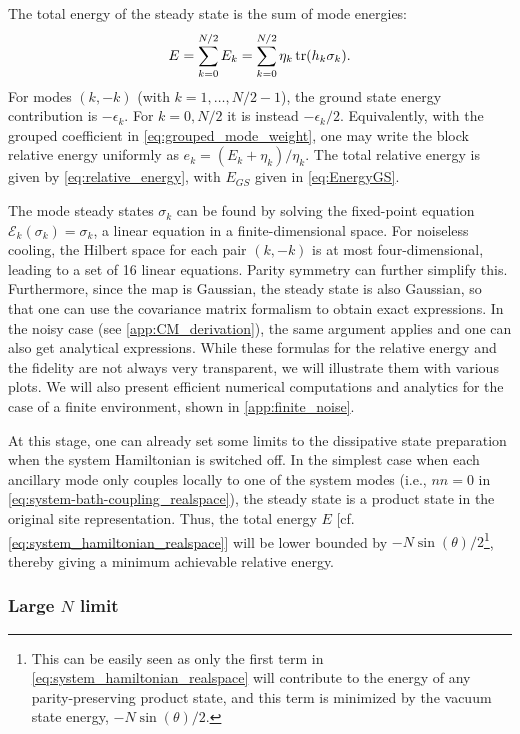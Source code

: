 \documentclass[aps,prx,twocolumn,superscriptaddress,nofootinbib,nolongbibliography,nobalancelastpage,10pt,floatfix]{revtex4-2}
\begin{document}
The total energy of the steady state is the sum of mode energies:
\begin{equation}
    E =\sum_{k=0}^{N/2} E_k = \sum_{k=0}^{N/2} \eta_k \operatorname{tr}( h_k \sigma_k).
\end{equation}
For modes $(k,-k)$ (with $k=1,\ldots,N/2-1$), the ground state energy contribution is $-\epsilon_k$.  For $k=0,N/2$ it is instead $-\epsilon_k/2$.  Equivalently, with the grouped coefficient in \cref{eq:grouped_mode_weight}, one may write the block relative energy uniformly as $e_k=(E_k+\eta_k)/\eta_k$. The total relative energy is given by \cref{eq:relative_energy}, with $E_{GS}$ given in \cref{eq:EnergyGS}.

The mode steady states $\sigma_k$ can be found by solving the fixed-point equation $\mathcal{E}_k(\sigma_k)=\sigma_k$, a linear equation in a finite-dimensional space. For noiseless cooling, the Hilbert space for each pair $(k,-k)$ is at most four-dimensional, leading to a set of 16 linear equations. Parity symmetry can further simplify this. Furthermore, since the map is Gaussian, the steady state is also Gaussian, so that one can use the covariance matrix formalism to obtain exact expressions. In the noisy case (see \cref{app:CM_derivation}), the same argument applies and one can also get analytical expressions. While these formulas for the relative energy and the fidelity are not always very transparent, we will illustrate them with various plots. We will also present efficient numerical computations and analytics for the case of a finite environment, shown in \cref{app:finite_noise}.

At this stage, one can already set some limits to the dissipative state preparation when the system Hamiltonian is switched off. In the simplest case when each ancillary mode only couples locally to one of the system modes (i.e., $nn=0$ in \cref{eq:system-bath-coupling_realspace}), the steady state is a product state in the original site representation. Thus, the total energy $E$ [cf. \cref{eq:system_hamiltonian_realspace}] will be lower bounded by $-N\sin(\theta)/2$\footnote{This can be easily seen as only the first term in \cref{eq:system_hamiltonian_realspace} will contribute to the energy of any parity-preserving product state, and this term is minimized by the vacuum state energy, $-N \sin(\theta)/2$.}, thereby giving a minimum achievable relative energy.

\subsubsection{Large \texorpdfstring{$N$}{N} limit}
\label{subsubsec:large_N_limit}
\end{document}
